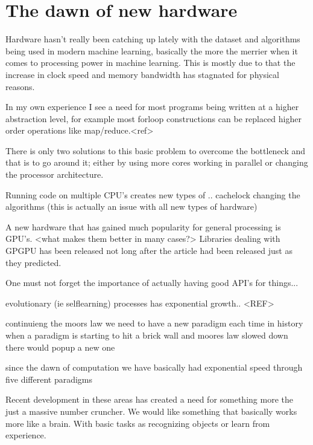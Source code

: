 \documentclass{article}
\begin{document}

\section{The dawn of new hardware}

    Hardware hasn't really been catching up lately with the dataset and algorithms
    being used in modern machine learning, basically the more the merrier when it comes
    to processing power in machine learning. This is mostly due to that the
    increase in clock speed and memory bandwidth has stagnated for physical
    reasons.
    
    In my own experience I see a need for most programs being written at
    a higher abstraction level, for example most forloop constructions can be
    replaced higher order operations like map/reduce.<ref> 

    There is only two solutions to this basic problem to overcome the
    bottleneck and that is to go around it; either by using more cores working in
    parallel or changing the processor architecture.

    Running code on multiple CPU's creates new types of .. 
    cachelock
    changing the algorithms (this is actually an issue with all new types of
    hardware)

    A new hardware that has gained much popularity for general processing is
    GPU's. <what makes them better in many cases?> 
    Libraries dealing with GPGPU has been released not long after the
    article\cite{ms2020} had been released just as they predicted.

    One must not forget the importance of actually having good API's for
    things...

evolutionary (ie selflearning) processes has exponential growth.. <REF>

continuieng the moors law we need to have a new paradigm
each time in history when a paradigm is starting to hit a brick wall and
moores law slowed down there would popup a new one

since the dawn of computation we have basically had exponential speed through
five different paradigms


Recent development in these areas has created a need for something more the
just a massive number cruncher. We would like something that basically works
more like a brain. With basic tasks as recognizing objects or learn from
experience.
\cite{synapse}
\end{document}
